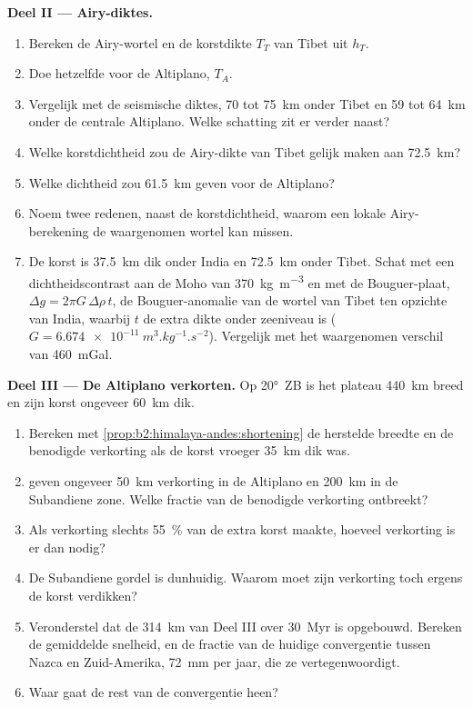 \begin{problem}
\noindent\textbf{Deel II --- Airy-diktes.}
\begin{enumerate}[resume]
\item Bereken de Airy-wortel en de korstdikte $T_T$ van Tibet uit $h_T$.
\item Doe hetzelfde voor de Altiplano, $T_A$.
\item Vergelijk met de seismische diktes, 70 tot \qty{75}{km} onder Tibet en 59 tot
\qty{64}{km} onder de centrale Altiplano. Welke schatting zit er verder naast?
\item Welke korstdichtheid zou de Airy-dikte van Tibet gelijk maken aan \qty{72.5}{km}?
\item Welke dichtheid zou \qty{61.5}{km} geven voor de Altiplano?
\item Noem twee redenen, naast de korstdichtheid, waarom een lokale Airy-berekening de
waargenomen wortel kan missen.
\item De korst is \qty{37.5}{km} dik onder India en \qty{72.5}{km} onder Tibet. Schat met een
dichtheidscontrast aan de Moho van \qty{370}{kg.m^{-3}} en met de Bouguer-plaat, $\Delta g
= 2\pi G\,\Delta\rho\,t$, de Bouguer-anomalie van de wortel van Tibet ten opzichte van India, waarbij $t$ de
extra dikte onder zeeniveau is ($G = \qty{6.674e-11}{m^3.kg^{-1}.s^{-2}}$). Vergelijk met het
waargenomen verschil van \qty{460}{mGal}.
\end{enumerate}

\noindent\textbf{Deel III --- De Altiplano verkorten.} Op \ang{20}~ZB is het plateau
\qty{440}{km} breed en zijn korst ongeveer \qty{60}{km} dik.
\begin{enumerate}[resume]
\item Bereken met \cref{prop:b2:himalaya-andes:shortening} de herstelde breedte en de
benodigde verkorting als de korst vroeger \qty{35}{km} dik was.
\item {} geven ongeveer \qty{50}{km} verkorting in de Altiplano en
\qty{200}{km} in de Subandiene zone. Welke fractie van de benodigde verkorting ontbreekt?
\item Als verkorting slechts \qty{55}{\percent} van de extra korst maakte, hoeveel verkorting is er dan
nodig?
\item De Subandiene gordel is dunhuidig. Waarom moet zijn verkorting toch ergens de korst
verdikken?
\item Veronderstel dat de \qty{314}{km} van Deel III over \qty{30}{Myr} is opgebouwd. Bereken de gemiddelde
snelheid, en de fractie van de huidige convergentie tussen Nazca en Zuid-Amerika, \qty{72}{mm} per jaar, die
ze vertegenwoordigt.
\item Waar gaat de rest van de convergentie heen?
\end{enumerate}


\end{problem}
